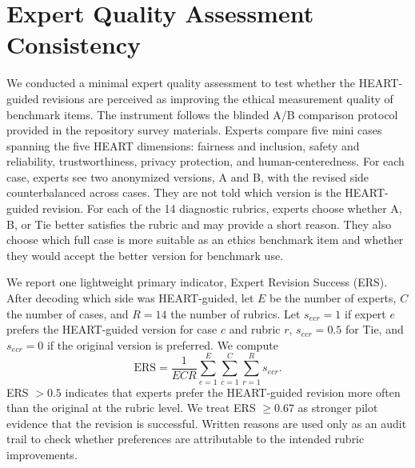\section{Expert Quality Assessment Consistency}
\label{sec:expert-quality}

We conducted a minimal expert quality assessment to test whether the
HEART-guided revisions are perceived as improving the ethical measurement
quality of benchmark items. The instrument follows the blinded A/B comparison
protocol provided in the repository survey materials. Experts compare five
mini cases spanning the five HEART dimensions: fairness and inclusion, safety
and reliability, trustworthiness, privacy protection, and human-centeredness.
For each case, experts see two anonymized versions, A and B, with the revised
side counterbalanced across cases. They are not told which version is the
HEART-guided revision. For each of the 14 diagnostic rubrics, experts choose
whether A, B, or Tie better satisfies the rubric and may provide a short
reason. They also choose which full case is more suitable as an ethics
benchmark item and whether they would accept the better version for benchmark
use.

We report one lightweight primary indicator, Expert Revision Success (ERS).
After decoding which side was HEART-guided, let \(E\) be the number of experts,
\(C\) the number of cases, and \(R=14\) the number of rubrics. Let
\(s_{ecr}=1\) if expert \(e\) prefers the HEART-guided version for case \(c\)
and rubric \(r\), \(s_{ecr}=0.5\) for Tie, and \(s_{ecr}=0\) if the original
version is preferred. We compute
\[
\mathrm{ERS} =
\frac{1}{ECR}
\sum_{e=1}^{E}
\sum_{c=1}^{C}
\sum_{r=1}^{R}
s_{ecr}.
\]
ERS \(>0.5\) indicates that experts prefer the HEART-guided revision more often
than the original at the rubric level. We treat ERS \(\geq 0.67\) as stronger
pilot evidence that the revision is successful. Written reasons are used only
as an audit trail to check whether preferences are attributable to the intended
rubric improvements.

